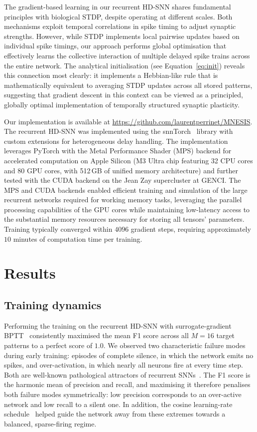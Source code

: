 \documentclass{article}
\begin{document}
The gradient-based learning in our recurrent HD-SNN shares fundamental principles with biological STDP, despite operating at different scales. Both mechanisms exploit temporal correlations in spike timing to adjust synaptic strengths. However, while STDP implements local pairwise updates based on individual spike timings, our approach performs global optimisation that effectively learns the collective interaction of multiple delayed spike trains across the entire network. The analytical initialisation (see Equation~\ref{eq:init}) reveals this connection most clearly: it implements a Hebbian-like rule that is mathematically equivalent to averaging STDP updates across all stored patterns, suggesting that gradient descent in this context can be viewed as a principled, globally optimal implementation of temporally structured synaptic plasticity.

Our implementation is available at \url{https://github.com/laurentperrinet/MNESIS}. The recurrent HD-SNN was implemented using the snnTorch~\citep{Eshraghian2023} library with custom extensions for heterogeneous delay handling. The implementation leverages PyTorch with the Metal Performance Shader (MPS) backend for accelerated computation on Apple Silicon (M3 Ultra chip featuring 32 CPU cores and 80 GPU cores, with 512\,GB of unified memory architecture) and further tested with the CUDA backend on the Jean Zay supercluster at GENCI. The MPS and CUDA backends enabled efficient training and simulation of the large recurrent networks required for working memory tasks, leveraging the parallel processing capabilities of the GPU cores while maintaining low-latency access to the substantial memory resources necessary for storing all tensors' parameters. Training typically converged within $4096$ gradient steps, requiring approximately $10$ minutes of computation time per training.


\section{Results}

\subsection{Training dynamics}

Performing the training on the recurrent HD-SNN with surrogate-gradient BPTT~\cite{Neftci2019a} consistently maximised the mean F1 score across all $M=16$ target patterns to a perfect score of $1.0$. We observed two characteristic failure modes during early training: episodes of complete silence, in which the network emits no spikes, and over-activation, in which nearly all neurons fire at every time step. Both are well-known pathological attractors of recurrent SNNs~\citep{Izhikevich2006}. The F1 score is the harmonic mean of precision and recall, and maximising it therefore penalises both failure modes symmetrically: low precision corresponds to an over-active network and low recall to a silent one. In addition, the cosine learning-rate schedule~\citep{Hammouamri2023} helped guide the network away from these extremes towards a balanced, sparse-firing regime.
\end{document}
